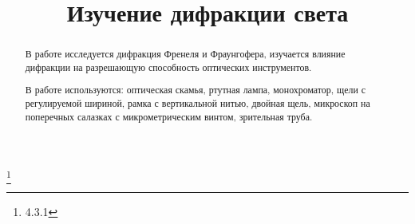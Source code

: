 


\title{Изучение дифракции света}
\thanks{4.3.1}



\begin{abstract}
В работе исследуется дифракция Френеля и Фраунгофера, изучается влияние дифракции на разрешающую способность оптических инструментов.

В работе используются: оптическая скамья, ртутная лампа, монохроматор, щели с регулируемой шириной, рамка с вертикальной нитью, двойная щель, микроскоп на поперечных салазках с микрометрическим винтом, зрительная труба.

\end{abstract}


\maketitle

